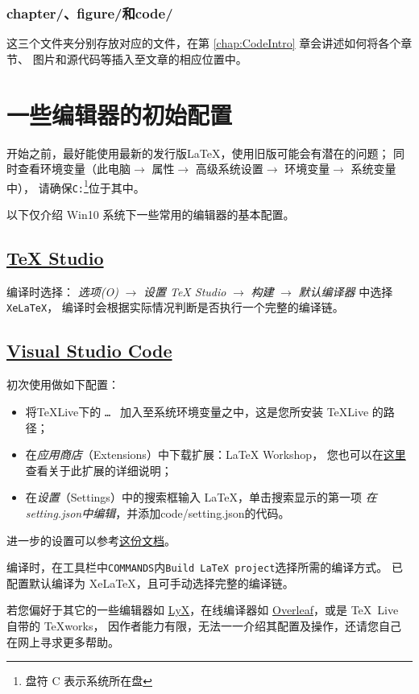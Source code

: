 \subsubsection{\textsf{chapter/}、\textsf{figure/}和\textsf{code/}}
这三个文件夹分别存放对应的文件，在第 \ref{chap:CodeIntro} 章会讲述如何将各个章节、
图片和源代码等插入至文章的相应位置中。

\section{一些编辑器的初始配置}
开始之前，最好能使用最新的发行版\LaTeX{}，使用旧版可能会有潜在的问题；
同时查看环境变量（此电脑$\rightarrow$ 属性$\rightarrow$ 高级系统设置$\rightarrow$
环境变量$\rightarrow$ 系统变量\,中），
请确保\texttt{C:}\footnote{盘符 C 表示系统所在盘}位于其中。

以下仅介绍 Win10 系统下一些常用的编辑器的基本配置。
\subsection{\href{http://texstudio.sourceforge.net}{\TeX{} Studio}}
编译时选择\XeLaTeX{}：
\emph{选项(O)} $\rightarrow$ \emph{设置 TeX Studio} $\rightarrow$
\emph{构建} $\rightarrow$ \emph{默认编译器} 中选择\texttt{XeLaTeX}，
编译时会根据实际情况判断是否执行一个完整的编译链。

\subsection{\href{https://code.visualstudio.com}{Visual Studio Code}}
初次使用做如下配置：
\begin{itemize}
	\item 将\TeX{}Live下的 \texttt{\dots {}
			} 加入至系统环境变量之中，这是您所安装 \TeX{}Live 的路径；
	\item 在\emph{应用商店}（Extensions）中下载扩展：\textsf{LaTeX Workshop}，
			您也可以在\href{https://github.com/James-Yu/LaTeX-Workshop}{这里}%
			查看关于此扩展的详细说明；
	\item 在\emph{设置}（Settings）中的搜索框输入 LaTeX，单击搜索显示的第一项
			\emph{在setting.json中编辑}，并添加\textsf{code/setting.json}的代码。
\end{itemize}
进一步的设置可以参考\href{https://github.com/EthanDeng/vscode-latex/}{这份文档}。

编译时，在工具栏中\texttt{COMMANDS}内\texttt{Build LaTeX project}选择所需的编译方式。
已配置默认编译为 XeLaTeX，且可手动选择完整的编译链。

若您偏好于其它的一些编辑器如 \href{http://www.lyx.org/}{LyX}，在线编译器如
\href{https://www.overleaf.com/}{Overleaf}，或是 \TeX\ Live 自带的 TeXworks，
因作者能力有限，无法一一介绍其配置及操作，还请您自己在网上寻求更多帮助。